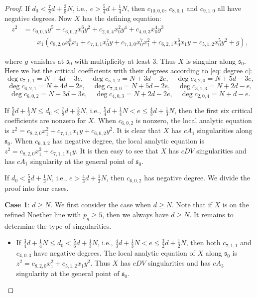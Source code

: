 \documentclass[a4paper,11pt]{amsart}
\newcommand{\s}{\ensuremath{\mathfrak{s}}}
\theoremstyle{definition}
\theoremstyle{remark}
\numberwithin{equation}{section}
\begin{document}
\begin{proof}
	If $d_0 < \frac78d + \frac38N$, i.e., $e > \frac{5}{4}d + \frac14 N$, then $c_{10,0,0}$, $c_{8,0,1}$ and $c_{9,1,0}$ all have negative degrees. Now $X$ has the defining equation:
    \begin{align*} %
        z^2 & =  c_{0, 0, 5}y^5 + c_{6,0,2}x_0^6y^2+c_{2,0,4}x_0^2y^4 +c_{4,0,3}x_0^4y^3 \\
        & \qquad x_1(c_{8,2,0}x_0^8x_1 + c_{7,1,1}x_0^7y + c_{7,3,0}x_0^7x_1^2 + c_{6,2,1}x_0^6x_1y + c_{5,1,2}x_0^5y^2 + g),
    \end{align*}

	where $g$ vanishes at $\s_0$ with multiplicity at least $3$. Thus $X$ is singular along $\s_0$. Here we list the critical coefficients with their degrees according to \eqref{eq: degree c}:
	$$
	\deg c_{7, 1, 1} = N + 4d - 3e, \quad \deg c_{5,1,2} = N + 3d - 2e, \quad \deg c_{8, 2, 0} = N + 5d - 3e,
	$$
	$$
	\deg c_{6,2,1} = N + 4d - 2e, \quad \deg c_{7,3,0} = N + 5d - 2e, \quad \deg c_{3,1,3} = N + 2d - e,
	$$
    $$
    \deg c_{6,0,2} = N + 3d - 3e, \quad \deg c_{4,0,3} = N + 2d - 2e, \quad \deg c_{2, 0, 4} = N + d - e.
    $$
    
    If $\frac56d + \frac13 N \le d_0 < \frac78d + \frac38 N$, i.e., $\frac54d + \frac14 N < e \le \frac43d + \frac13N$, then the first six critical coefficients are nonzero for $X$. When $c_{6,0,2}$ is nonzero, the local analytic equation is $z^2= c_{8,2,0} x_1^2 + c_{7,1,1}x_1y+c_{6,0,2}y^2$. It is clear that $X$ has $cA_1$ singularities along $\s_0$. When $c_{6,0,2}$ has negative degree, the local analytic equation is $z^2= c_{8,2,0} x_1^2 + c_{7,1,1}x_1y$.  It is then easy to see that $X$ has $cDV$ singularities and has $cA_1$ singularity at the general point of $\s_0$. 
    
    If $d_0 < \frac{5}{6}d + \frac{1}{3}N$, i.e., $e > \frac43d + \frac13N$, then $c_{6,0,2}$ has negative degree. We divide the proof into four cases.
    
    \textbf{Case 1}: $d \ge N$. We first consider the case when $d \ge N$. Note that if $X$ is on the refined Noether line with $p_g \ge 5$, then we always have $d \ge N$. It remains to determine the type of singularities.
	\begin{itemize}
		\item[(a1)] If $\frac34d + \frac14 N \le d_0 < \frac56d + \frac13 N$, i.e., $\frac43d + \frac13N < e \le \frac32d + \frac12N$, then both $c_{7,1,1}$ and $c_{4,0,3}$ have negative degrees. The local analytic equation of $X$ along $\s_0$ is $z^2 = c_{8,2,0}x_1^2 +  c_{5,1,2}x_1y^2 $.  Thus $X$ has $cDV$ singularities and has $cA_3$ singularity at the general point of $\s_0$. 
		

\end{itemize}
\end{proof}
\end{document}
